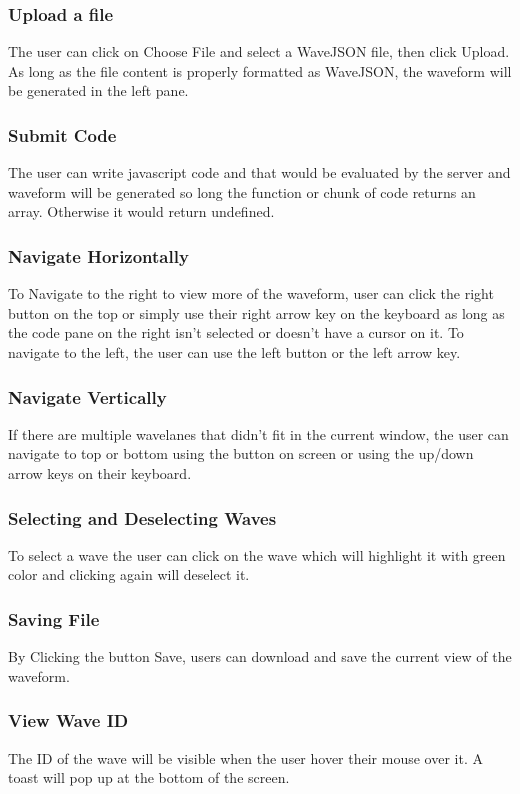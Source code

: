 \documentclass[14pt]{extarticle}
\begin{document}
\subsubsection{Upload a file}
 The user can click on Choose File and select a WaveJSON file, then click Upload. As long as the file content is properly formatted as WaveJSON, the waveform will be generated in the left pane.
\subsubsection{Submit Code}
 The user can write javascript code and that would be evaluated by the server and waveform will be generated so long the function or chunk of code returns an array. Otherwise it would return undefined.
\subsubsection{Navigate Horizontally}
 To Navigate to the right to view more of the waveform, user can click the right button on the top or simply use their right arrow key on the keyboard as long as the code pane on the right isn’t selected or doesn’t have a cursor on it. To navigate to the left, the user can use the left button or the left arrow key.
\subsubsection{Navigate Vertically}
 If there are multiple wavelanes that didn’t fit in the current window, the user can navigate to top or bottom using the button on screen or using the up/down arrow keys on their keyboard.
\subsubsection{Selecting and Deselecting Waves}
 To select a wave the user can click on the wave which will highlight it with green color and clicking again will deselect it.
\subsubsection{Saving File}
 By Clicking the button Save, users can download and save the current view of the waveform.
\subsubsection{View Wave ID}
 The ID of the wave will be visible when the user hover their mouse over it. A toast will pop up at the bottom of the screen.
\end{document}

